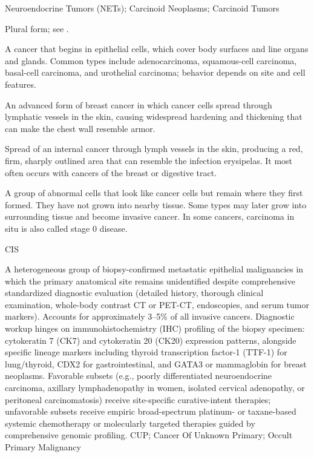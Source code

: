 \synonyms
Neuroendocrine Tumors (NETs); Carcinoid Neoplasms; Carcinoid Tumors

 Plural form; see .

 A cancer that begins in epithelial cells, which cover body surfaces and line organs and glands. Common types include adenocarcinoma, squamous-cell carcinoma, basal-cell carcinoma, and urothelial carcinoma; behavior depends on site and cell features.

 An advanced form of breast cancer in which cancer cells spread through lymphatic vessels in the skin, causing widespread hardening and thickening that can make the chest wall resemble armor.

 Spread of an internal cancer through lymph vessels in the skin, producing a red, firm, sharply outlined area that can resemble the infection erysipelas. It most often occurs with cancers of the breast or digestive tract.

 A group of abnormal cells that look like cancer cells but remain where they first formed. They have not grown into nearby tissue. Some types may later grow into surrounding tissue and become invasive cancer. In some cancers, carcinoma in situ is also called stage 0 disease.

\synonyms
CIS

 A heterogeneous group of biopsy-confirmed metastatic epithelial malignancies in which the primary anatomical site remains unidentified despite comprehensive standardized diagnostic evaluation (detailed history, thorough clinical examination, whole-body contrast CT or PET-CT, endoscopies, and serum tumor markers). Accounts for approximately 3--5\% of all invasive cancers. Diagnostic workup hinges on immunohistochemistry (IHC) profiling of the biopsy specimen: cytokeratin 7 (CK7) and cytokeratin 20 (CK20) expression patterns, alongside specific lineage markers including thyroid transcription factor-1 (TTF-1) for lung/thyroid, CDX2 for gastrointestinal, and GATA3 or mammaglobin for breast neoplasms. Favorable subsets (e.g., poorly differentiated neuroendocrine carcinoma, axillary lymphadenopathy in women, isolated cervical adenopathy, or peritoneal carcinomatosis) receive site-specific curative-intent therapies; unfavorable subsets receive empiric broad-spectrum platinum- or taxane-based systemic chemotherapy or molecularly targeted therapies guided by comprehensive genomic profiling.
\synonyms
CUP; Cancer Of Unknown Primary; Occult Primary Malignancy

